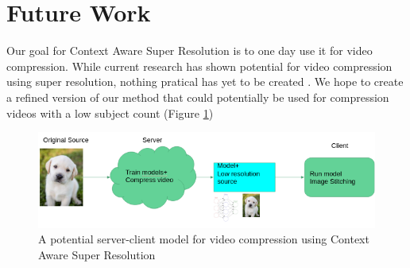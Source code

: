 \section{Future Work}

Our goal for Context Aware Super Resolution is to one day use it for video
compression. While current research has shown
potential for video compression using super resolution, nothing pratical has yet
to be created \cite{Molina,Kappeler2016}. We hope to create a refined version of our method that
could potentially be used for compression videos with a low subject count
(Figure \ref{fig:compression})

\begin{figure}
    \centering
    \includegraphics[width=.45\textwidth]{images/compression.png}
    \caption{A potential server-client model for video compression using Context Aware Super Resolution}
    \label{fig:compression}
\end{figure}

